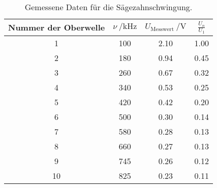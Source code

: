 \begin{table}[H]
  \centering
   \begin{tabular}{c c c c}
    \toprule
    Nummer der Oberwelle & $ \nu \: / \si{\kHz}$ & $ U_{\text{Messwert}}\: / \si{\volt} $ &
    $ \frac{U_{n}}{U_{1}} $\\
    \midrule
    1 & 100 & 2.10 & 1.00 \\
    2 & 180 & 0.94 & 0.45 \\
    3 & 260 & 0.67 & 0.32 \\
    4 & 340 & 0.53 & 0.25 \\
    5 & 420 & 0.42 & 0.20 \\
    6 & 500 & 0.30 & 0.14 \\
    7 & 580 & 0.28 & 0.13 \\
    8 & 660 & 0.27 & 0.13 \\
    9 & 745 & 0.26 & 0.12 \\
    10 & 825 & 0.23 & 0.11 \\
    \bottomrule
  \end{tabular}
  \caption{Gemessene Daten für die Sägezahnschwingung.}
  \label{tab:tabe3}
\end{table}

